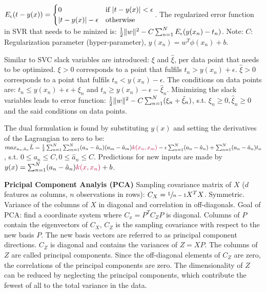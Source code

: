 $E_\epsilon (t-y(x)) = \begin{cases} 
0 &\mbox{if } \lvert t-y(x) \rvert < \epsilon \\
\lvert t-y(x) \rvert - \epsilon & \mbox{otherwise}
\end{cases}$.
The regularized error function in SVR that needs to be minized is:
$\frac{1}{2} \lVert w \rVert^2 - C \sum_{n=1}^N E_{\epsilon} (y(x_n) - t_n)$.
Note: $C$: Regularization parameter (hyper-parameter), $y(x_n)=w^T \phi(x_n)+b$.

Similar to SVC slack variables are introduced: $\xi$ and $\hat{\xi}$, per data point that needs to be optimized.
$\xi>0$ corresponds to a point that fulfils $t_n > y(x_n) + \epsilon$. 
$\hat{\xi}>0$ corresponds to a point that fulfils $t_n < y(x_n) - \epsilon$. 
The conditions on data points are: $t_n \leq y(x_n) + \epsilon + \xi_n$ and $t_n \geq y(x_n) - \epsilon - \hat{\xi}_n$.
Minimizing the slack variables leads to error function:
$\frac{1}{2} \lVert w \rVert^2 - C \sum_{n=1}^N (\xi_n + \hat{\xi}_n)$, s.t. $\xi_n\geq 0, \hat{\xi}_n \geq 0$ and the said conditions on data points.

The dual formulation is found by substituting $y(x)$ and setting the derivatives of the Lagrangian to zero to be:
$max_{a_n, \hat{a}_n} \tilde{L} = \frac{1}{2} \sum_{n=1}^N \sum_{m=1}^N (a_n - \hat{a}_n) (a_m - \hat{a}_m) \textcolor{purple}{k(x_n,x_m)} - \epsilon \sum_{n=1}^N (a_n - \hat{a}_n) + \sum_{n=1}^N (a_n - \hat{a}_n)t_n$, 
s.t. $0\leq a_n \leq C, 0 \leq \hat{a}_n \leq C$.
Predictions for new inputs are made by $y(x) = \sum_{n=1}^N (a_n - \hat{a}_n) \textcolor{purple}{k(x,x_n)} + b$.

\textbf{Pricipal Component Analyis (PCA)}
Sampling covariance matrix of $X$ ($d$ features as columns, $n$ observations in rows): $C_X = \sfrac{1}{n-1}X^T X$.
Symmetric. Variance of the columns of $X$ in diagonal and correlation in off-diagonals.
Goal of PCA: find a coordinate system where $C_x = P^T C_Z P$ is diagonal. 
Columns of $P$ contain the eigenvectors of $C_X$, $C_Z$ is the sampling covariance with respect to the new basis $P$.
The new basis vectors are referred to as principal component directions.
$C_Z$ is diagonal and contains the variances of $Z = XP$.
The columns of $Z$ are called principal components.
Since the off-diagonal elements of $C_Z$ are zero, the correlations of the principal components are zero.
The dimensionality of $Z$ can be reduced by neglecting the principal components, which contribute the fewest of all to the total variance in the data.

